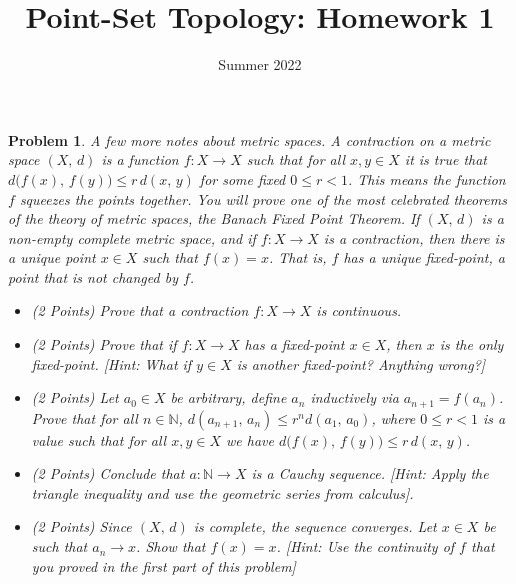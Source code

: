 \documentclass{article}
\title{Point-Set Topology: Homework 1}
\date{Summer 2022}
\theoremstyle{normal}
\newtheorem{problem}{Problem}
\begin{document}
    \maketitle
    \color{blue}
    \begin{problem}
        A few more notes about metric spaces. A \textit{contraction} on a
        metric space $(X,\,d)$ is a function $f:X\rightarrow{X}$ such that
        for all $x,y\in{X}$ it is true that
        $d\big(f(x),\,f(y)\big)\leq{r}\,d(x,\,y)$ for some fixed $0\leq{r}<1$.
        This means the function $f$ \textit{squeezes} the points together.
        You will prove one of the most celebrated theorems of the theory of
        metric spaces, the \textit{Banach Fixed Point Theorem}.
        If $(X,\,d)$ is a non-empty complete metric space, and if
        $f:X\rightarrow{X}$ is
        a contraction, then there is a unique point $x\in{X}$ such that
        $f(x)=x$. That is, $f$ has a unique \textit{fixed-point}, a point that
        is not changed by $f$.
        \begin{itemize}
            \item (2 Points) Prove that a contraction $f:X\rightarrow{X}$ is
                continuous.
            \item (2 Points) Prove that if $f:X\rightarrow{X}$ has a
                fixed-point $x\in{X}$, then $x$ is the only fixed-point.
                [Hint: What if $y\in{X}$ is another fixed-point? Anything wrong?]
            \item (2 Points) Let $a_{0}\in{X}$ be arbitrary, define $a_{n}$
                inductively via $a_{n+1}=f(a_{n})$. Prove that for all
                $n\in\mathbb{N}$,
                $d(a_{n+1},\,a_{n})\leq{r}^{n}d(a_{1},\,a_{0})$, where
                $0\leq{r}<1$ is a value such that for all
                $x,y\in{X}$ we have
                $d\big(f(x),\,f(y)\big)\leq{r}\,d(x,\,y)$.
            \item (2 Points) Conclude that $a:\mathbb{N}\rightarrow{X}$ is a
                Cauchy sequence. [Hint: Apply the triangle inequality and use
                the geometric series from calculus].
            \item (2 Points) Since $(X,\,d)$ is complete, the sequence
            converges. Let $x\in{X}$ be such that
            $a_{n}\rightarrow{x}$. Show that $f(x)=x$.
            [Hint: Use the continuity of $f$ that you proved in the first part
            of this problem]
        \end{itemize}
    \end{problem}
\end{document}

